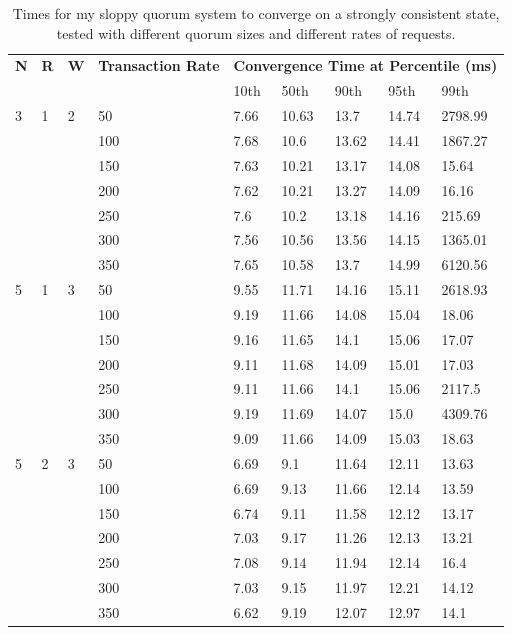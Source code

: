 \documentclass[12pt,a4paper,twoside,openany]{report}
\begin{document}
\begin{table}[h!]
\centering
\renewcommand{\arraystretch}{1.3}
\begin{tabular}{@{} l l l l l l l l l @{}}
\toprule
\bf N & \bf R & \bf W & \bf Transaction Rate & \multicolumn{5}{c}{\bf Convergence Time at Percentile (ms)} \\
& & & & 10th & 50th & 90th & 95th & 99th \\
\hline
3 & 1 & 2 & 50 & 7.66 & 10.63 & 13.7 & 14.74 & 2798.99 \\
& & & 100 & 7.68 & 10.6 & 13.62 & 14.41 & 1867.27 \\
& & & 150 & 7.63 & 10.21 & 13.17 & 14.08 & 15.64 \\
& & & 200 & 7.62 & 10.21 & 13.27 & 14.09 & 16.16 \\
& & & 250 & 7.6 & 10.2 & 13.18 & 14.16 & 215.69 \\
& & & 300 & 7.56 & 10.56 & 13.56 & 14.15 & 1365.01 \\
& & & 350 & 7.65 & 10.58 & 13.7 & 14.99 & 6120.56 \\
\hline
5 & 1 & 3 & 50 & 9.55 & 11.71 & 14.16 & 15.11 & 2618.93 \\
& & & 100 & 9.19 & 11.66 & 14.08 & 15.04 & 18.06 \\
& & & 150 & 9.16 & 11.65 & 14.1 & 15.06 & 17.07 \\
& & & 200 & 9.11 & 11.68 & 14.09 & 15.01 & 17.03 \\
& & & 250 & 9.11 & 11.66 & 14.1 & 15.06 & 2117.5 \\
& & & 300 & 9.19 & 11.69 & 14.07 & 15.0 & 4309.76 \\
& & & 350 & 9.09 & 11.66 & 14.09 & 15.03 & 18.63 \\
\hline
5 & 2 & 3 & 50 & 6.69 & 9.1 & 11.64 & 12.11 & 13.63 \\
& & & 100 & 6.69 & 9.13 & 11.66 & 12.14 & 13.59 \\
& & & 150 & 6.74 & 9.11 & 11.58 & 12.12 & 13.17 \\
& & & 200 & 7.03 & 9.17 & 11.26 & 12.13 & 13.21 \\
& & & 250 & 7.08 & 9.14 & 11.94 & 12.14 & 16.4 \\
& & & 300 & 7.03 & 9.15 & 11.97 & 12.21 & 14.12 \\
& & & 350 & 6.62 & 9.19 & 12.07 & 12.97 & 14.1 \\
\bottomrule
\end{tabular}
\caption{Times for my sloppy quorum system to converge on a strongly consistent state, tested with different quorum sizes and different rates of requests.}
\label{convergencetimes}
\end{table}
\end{document}
